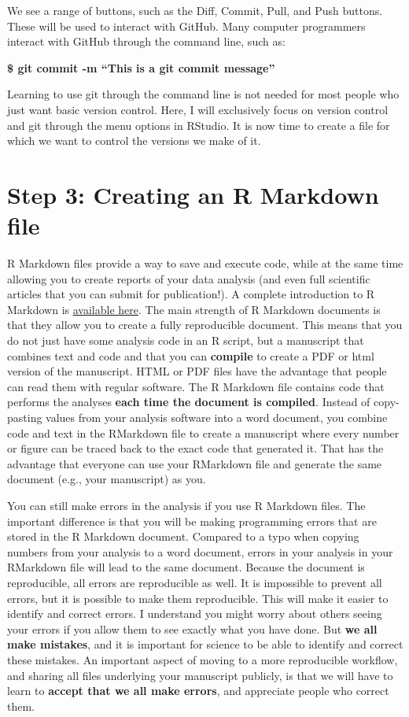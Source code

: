 \documentclass[
  oneside]{krantz}
\begin{document}
We see a range of buttons, such as the Diff, Commit, Pull, and Push buttons.
These will be used to interact with GitHub. Many computer programmers interact
with GitHub through the command line, such as:

\textbf{\$ git commit -m ``This is a git commit message''}

Learning to use git through the command line is not needed for most people who
just want basic version control. Here, I will exclusively focus on version
control and git through the menu options in RStudio. It is now time to create a
file for which we want to control the versions we make of it.

\hypertarget{step-3-creating-an-r-markdown-file}{%
\section{Step 3: Creating an R Markdown file}\label{step-3-creating-an-r-markdown-file}}

R Markdown files provide a way to save and execute code, while at the same time
allowing you to create reports of your data analysis (and even full scientific
articles that you can submit for publication!). A complete introduction to R
Markdown is \href{https://rmarkdown.rstudio.com/lesson-1.html}{available here}. The
main strength of R Markdown documents is that they allow you to create a fully
reproducible document. This means that you do not just have some analysis code
in an R script, but a manuscript that combines text and code and that you can
\textbf{compile} to create a PDF or html version of the manuscript. HTML or PDF files
have the advantage that people can read them with regular software. The R
Markdown file contains code that performs the analyses \textbf{each time the document
is compiled}. Instead of copy-pasting values from your analysis software into a
word document, you combine code and text in the RMarkdown file to create a
manuscript where every number or figure can be traced back to the exact code
that generated it. That has the advantage that everyone can use your RMarkdown
file and generate the same document (e.g., your manuscript) as you.

You can still make errors in the analysis if you use R Markdown files. The
important difference is that you will be making programming errors that are
stored in the R Markdown document. Compared to a typo when copying numbers from
your analysis to a word document, errors in your analysis in your RMarkdown file
will lead to the same document. Because the document is reproducible, all errors
are reproducible as well. It is impossible to prevent all errors, but it is
possible to make them reproducible. This will make it easier to identify and
correct errors. I understand you might worry about others seeing your errors if
you allow them to see exactly what you have done. But \textbf{we all make mistakes},
and it is important for science to be able to identify and correct these
mistakes. An important aspect of moving to a more reproducible workflow, and
sharing all files underlying your manuscript publicly, is that we will have to
learn to \textbf{accept that we all make errors}, and appreciate people who correct
them.
\end{document}
